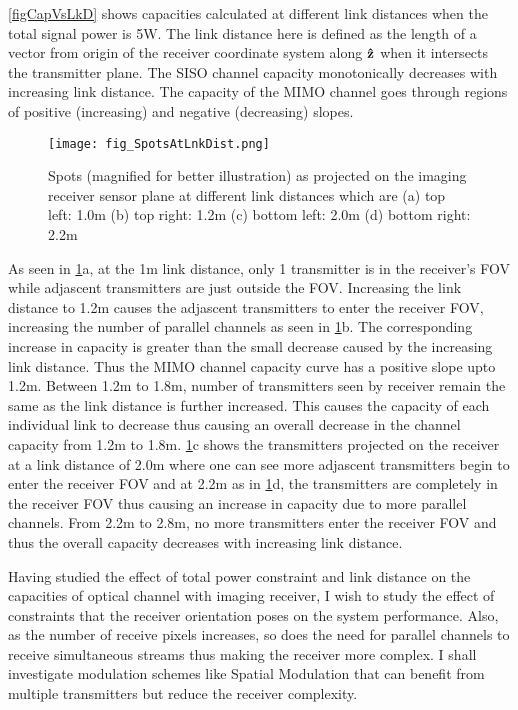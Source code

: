 \figurename{ \ref{figCapVsLkD}} shows capacities calculated at different link distances when the total signal power is 5W. The link distance here is defined as the length of a vector from origin of the receiver coordinate system along {$\bf{\hat{z}}$} when it intersects the transmitter plane. The SISO channel capacity monotonically decreases with increasing link distance. The capacity of the MIMO channel goes through regions of positive (increasing) and negative (decreasing) slopes. 

\begin{figure}[!t]
	\centering
		\texttt{[image: fig\_SpotsAtLnkDist.png]}
	\caption[Spots on sensor at different link distances]{Spots (magnified for better illustration) as projected on the imaging receiver sensor plane at different link distances which are (a) top left: 1.0m (b) top right: 1.2m (c) bottom left: 2.0m (d) bottom right: 2.2m}
	\label{figSpotsVsLink}
\end{figure}

As seen in \figurename{ \ref{figSpotsVsLink}}a, at the 1m link distance, only 1 transmitter is in the receiver's FOV while adjascent transmitters are just outside the FOV. Increasing the link distance to 1.2m causes the adjascent transmitters to enter the receiver FOV, increasing the number of parallel channels as seen in \figurename{\ref{figSpotsVsLink}}b. The corresponding increase in capacity is greater than the small decrease caused by the increasing link distance. Thus the MIMO channel capacity curve has a positive slope upto 1.2m. Between 1.2m  to 1.8m, number of transmitters seen by receiver remain the same as the link distance is further increased. This causes the capacity of each individual link to decrease thus causing an overall decrease in the channel capacity from 1.2m to 1.8m. \figurename{\ref{figSpotsVsLink}}c shows the transmitters projected on the receiver at a link distance of 2.0m where one can see more adjascent transmitters begin to enter the receiver FOV and at 2.2m as in \figurename{ \ref{figSpotsVsLink}}d, the transmitters are completely in the receiver FOV thus causing an increase in capacity due to more parallel channels. From 2.2m to 2.8m, no more transmitters enter the receiver FOV and thus the overall capacity decreases with increasing link distance. 

Having studied the effect of total power constraint and link distance on the capacities of optical channel with imaging receiver, I wish to study the effect of constraints that the receiver orientation poses on the system performance. Also, as the number of receive pixels increases, so does the need for parallel channels to receive simultaneous streams thus making the receiver more complex. I shall investigate modulation schemes like Spatial Modulation that can benefit from multiple transmitters but reduce the receiver complexity.

